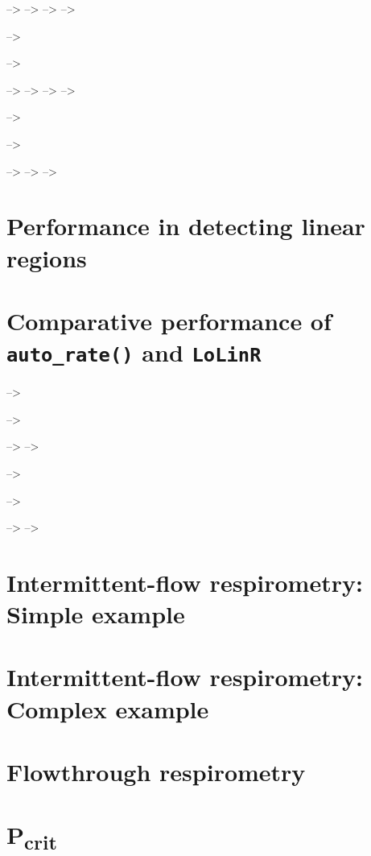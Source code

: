 \documentclass[]{book}
\begin{document}
--\textgreater{} --\textgreater{} --\textgreater{} --\textgreater{}

--\textgreater{}

--\textgreater{}

--\textgreater{} --\textgreater{} --\textgreater{} --\textgreater{}

--\textgreater{}

--\textgreater{}

--\textgreater{} --\textgreater{} --\textgreater{}

\chapter{Performance in detecting linear
regions}\label{performance-in-detecting-linear-regions}

\chapter{\texorpdfstring{Comparative performance of
\texttt{auto\_rate()} and
\texttt{LoLinR}}{Comparative performance of auto\_rate() and LoLinR}}\label{comparative-performance-of-auto_rate-and-lolinr}

--\textgreater{}

--\textgreater{}

--\textgreater{} --\textgreater{}

--\textgreater{}

--\textgreater{}

--\textgreater{} --\textgreater{}

\chapter{Intermittent-flow respirometry: Simple
example}\label{intermittent-flow-respirometry-simple-example}

\chapter{Intermittent-flow respirometry: Complex
example}\label{intermittent-flow-respirometry-complex-example}

\chapter{Flowthrough respirometry}\label{flowthrough-respirometry}

\chapter{\texorpdfstring{P\textsubscript{crit}}{Pcrit}}\label{pcrit}
\end{document}
